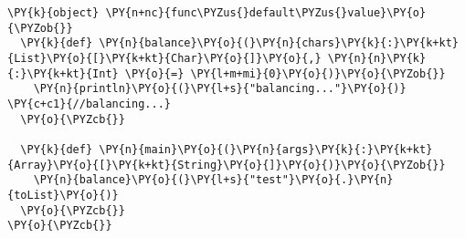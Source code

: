 \begin{Verbatim}[commandchars=\\\{\}]
\PY{k}{object} \PY{n+nc}{func\PYZus{}default\PYZus{}value}\PY{o}{\PYZob{}}
  \PY{k}{def} \PY{n}{balance}\PY{o}{(}\PY{n}{chars}\PY{k}{:}\PY{k+kt}{List}\PY{o}{[}\PY{k+kt}{Char}\PY{o}{]}\PY{o}{,} \PY{n}{n}\PY{k}{:}\PY{k+kt}{Int} \PY{o}{=} \PY{l+m+mi}{0}\PY{o}{)}\PY{o}{\PYZob{}}
    \PY{n}{println}\PY{o}{(}\PY{l+s}{"balancing..."}\PY{o}{)} \PY{c+c1}{//balancing...}
  \PY{o}{\PYZcb{}}

  \PY{k}{def} \PY{n}{main}\PY{o}{(}\PY{n}{args}\PY{k}{:}\PY{k+kt}{Array}\PY{o}{[}\PY{k+kt}{String}\PY{o}{]}\PY{o}{)}\PY{o}{\PYZob{}}
    \PY{n}{balance}\PY{o}{(}\PY{l+s}{"test"}\PY{o}{.}\PY{n}{toList}\PY{o}{)}
  \PY{o}{\PYZcb{}}
\PY{o}{\PYZcb{}}
\end{Verbatim}
